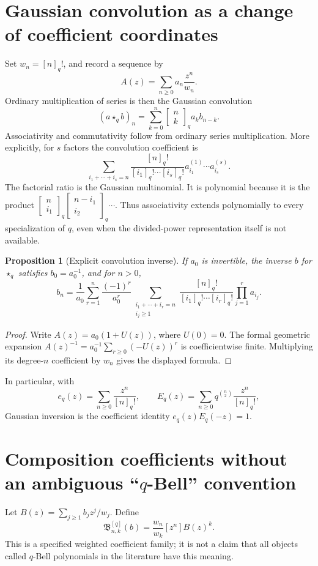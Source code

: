 \documentclass[11pt,a4paper,oneside,openany]{book}
\newtheorem{proposition}[theorem]{Proposition}
\theoremstyle{definition}
\theoremstyle{remark}
\newcommand{\GB}[3][q]{\begin{bmatrix}#2\\#3\end{bmatrix}_{#1}}
\newcommand{\qB}[2]{\mathfrak B^{[q]}_{#1,#2}}
\newcommand{\qbname}{\texorpdfstring{$q$}{q}}
\begin{document}
\section{Gaussian convolution as a change of coefficient coordinates}
Set \(w_n=[n]_q!\), and record a sequence by
\[
 A(z)=\sum_{n\ge0}a_n\frac{z^n}{w_n}.
\]
Ordinary multiplication of series is then the Gaussian convolution
\begin{equation}\label{qcc:q-convolution}
 (a\star_q b)_n=\sum_{k=0}^n\GB nk a_kb_{n-k}.
\end{equation}
Associativity and commutativity follow from ordinary series multiplication.
More explicitly, for \(s\) factors the convolution coefficient is
\begin{equation}\label{qcc:q-multinomial}
 \sum_{i_1+\cdots+i_s=n}
 \frac{[n]_q!}{[i_1]_q!\cdots[i_s]_q!}
 a^{(1)}_{i_1}\cdots a^{(s)}_{i_s}.
\end{equation}
The factorial ratio is the Gaussian multinomial. It is polynomial because it is
the product
\(\GB n{i_1}\GB{n-i_1}{i_2}\cdots\).
Thus associativity extends polynomially to every specialization of \(q\), even
when the divided-power representation itself is not available.

\begin{proposition}[Explicit convolution inverse]\label{qcc:convolution-inverse}
If \(a_0\) is invertible, the inverse \(b\) for \(\star_q\) satisfies
\(b_0=a_0^{-1}\), and for \(n>0\),
\begin{equation}\label{qcc:convolution-inverse-formula}
 b_n=\frac1{a_0}\sum_{r=1}^n\frac{(-1)^r}{a_0^r}
 \sum_{\substack{i_1+\cdots+i_r=n\\i_j\ge1}}
 \frac{[n]_q!}{[i_1]_q!\cdots[i_r]_q!}\prod_{j=1}^r a_{i_j}.
\end{equation}
\end{proposition}
\begin{proof}
Write \(A(z)=a_0(1+U(z))\), where \(U(0)=0\). The formal geometric expansion
\(A(z)^{-1}=a_0^{-1}\sum_{r\ge0}(-U(z))^r\) is coefficientwise finite.
Multiplying its degree-\(n\) coefficient by \(w_n\) gives the displayed formula.
\end{proof}
In particular, with
\[
 e_q(z)=\sum_{n\ge0}\frac{z^n}{[n]_q!},\qquad
 E_q(z)=\sum_{n\ge0}q^{\binom n2}\frac{z^n}{[n]_q!},
\]
Gaussian inversion is the coefficient identity \(e_q(z)E_q(-z)=1\).

\section{Composition coefficients without an ambiguous ``\qbname-Bell'' convention}
Let
\(B(z)=\sum_{j\ge1}b_jz^j/w_j\). Define
\begin{equation}\label{qcc:weighted-bell-def}
 \qB nk(b)=\frac{w_n}{w_k}[z^n]B(z)^k.
\end{equation}
This is a specified weighted coefficient family; it is not a claim that all
objects called \(q\)-Bell polynomials in the literature have this meaning.
\end{document}
